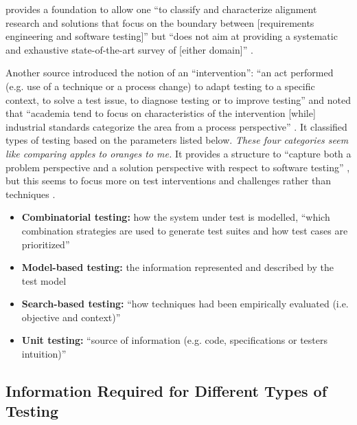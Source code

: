 \cite{unterkalmsteiner_taxonomy_2014} provides a foundation to allow one ``to
classify and characterize alignment research and solutions that focus on the
boundary between [requirements engineering and software testing]'' but ``does
not aim at providing a systematic and exhaustive state-of-the-art survey of
[either domain]'' \cite[p.~A:2]{unterkalmsteiner_taxonomy_2014}.

Another source
introduced the notion of an ``intervention'': ``an act performed (e.g. use of a
technique or a process change) to adapt testing to a specific context, to solve
a test issue, to diagnose testing or to improve testing''
\cite[p.~1]{engström_mapping_2015} and noted that ``academia tend to focus on
characteristics of the intervention [while] industrial standards categorize the
area from a process perspective'' \cite[p.~2]{engström_mapping_2015}. It
classified types of testing based on the parameters listed below.
\emph{These four categories seem like comparing apples to oranges to me.}
It provides a structure to ``capture both a problem perspective and a solution
perspective with respect to software testing'' \cite[pp.~3-4]{engström_mapping_2015},
but this seems to focus more on test interventions and challenges rather than
techniques \cite[Fig.~5]{engström_mapping_2015}.

\begin{itemize}
      \item \textbf{Combinatorial testing:} how the system under test is
            modelled, ``which combination strategies are used to generate test
            suites and how test cases are prioritized''
            \cite[pp.~1-2]{engström_mapping_2015}
      \item \textbf{Model-based testing:} the information represented and
            described by the test model \cite[p.~2]{engström_mapping_2015}
      \item \textbf{Search-based testing:} ``how techniques had been
            empirically evaluated (i.e. objective and context)''
            \cite[p.~2]{engström_mapping_2015}
      \item \textbf{Unit testing:} ``source of information (e.g. code,
            specifications or testers intuition)''
            \cite[p.~2]{engström_mapping_2015}
\end{itemize}

\subsection{Information Required for Different Types of Testing}

